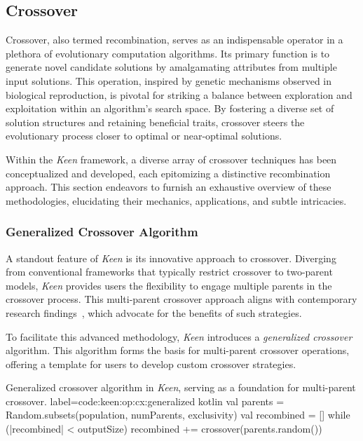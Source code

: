 \subsection{Crossover}
\label{sec:keen:op:cx}
    Crossover, also termed recombination, serves as an indispensable operator in 
    a plethora of evolutionary computation algorithms. Its primary function is to 
    generate novel candidate solutions by amalgamating attributes from multiple 
    input solutions. This operation, inspired by genetic mechanisms observed in 
    biological reproduction, is pivotal for striking a balance between 
    exploration and exploitation within an algorithm's search space. By fostering 
    a diverse set of solution structures and retaining beneficial traits, 
    crossover steers the evolutionary process closer to optimal or near-optimal 
    solutions.

    Within the \textit{Keen} framework, a diverse array of crossover techniques 
    has been conceptualized and developed, each epitomizing a distinctive 
    recombination approach. This section endeavors to furnish an exhaustive 
    overview of these methodologies, elucidating their mechanics, applications, 
    and subtle intricacies.

    
    \subsubsection{Generalized Crossover Algorithm}
        A standout feature of \textit{Keen} is its innovative approach to crossover. Diverging from conventional 
        frameworks that typically restrict crossover to two-parent models, \textit{Keen} provides users the flexibility 
        to engage multiple parents in the crossover process. This multi-parent crossover approach aligns with 
        contemporary research findings~\autocite{tsutsuiMultiparentRecombinationSimplex1999,elsayedGANewMultiparent2011,arramNovelMultiparentOrder2019}, 
        which advocate for the benefits of such strategies.

        To facilitate this advanced methodology, \textit{Keen} introduces a \textit{generalized crossover} algorithm. 
        This algorithm forms the basis for multi-parent crossover operations, offering a template for users to develop 
        custom crossover strategies.

        \begin{code}{
            Generalized crossover algorithm in \textit{Keen}, serving as a foundation for multi-parent crossover.
        }{
            label=code:keen:op:cx:generalized
        }{kotlin}
            val parents = Random.subsets(population, numParents, exclusivity)
            val recombined = []
            while (|recombined| < outputSize) {
                recombined += crossover(parents.random())
            }
        \end{code}

